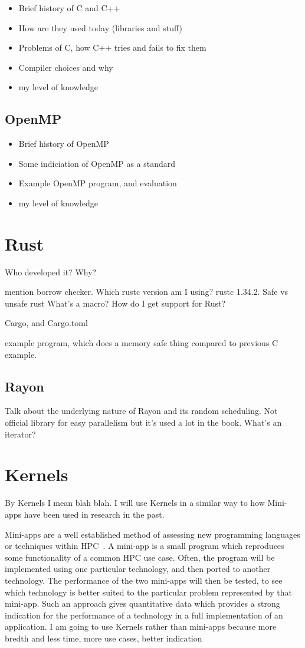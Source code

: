 \begin{itemize}
    \item Brief history of C and C++
    \item How are they used today (libraries and stuff)
    \item Problems of C, how C++ tries and fails to fix them
    \item Compiler choices and why
    \item my level of knowledge
\end{itemize}
\subsection{OpenMP}
\begin{itemize}
    \item Brief history of  OpenMP
    \item Some indiciation of OpenMP as a standard
    \item Example OpenMP program, and evaluation
    \item my level of knowledge
\end{itemize}

\section{Rust}
Who developed it? Why?

mention borrow checker. Which rustc version am I using? rustc 1.34.2. Safe vs unsafe rust
What's a macro?
How do I get support for Rust?

Cargo, and Cargo.toml
 
example program, which does a memory safe thing compared to previous C example.
\subsection{Rayon}
Talk about the underlying nature of Rayon and its random scheduling. Not official library for easy parallelism but it's used a lot in the book.
What's an iterator?
\section{Kernels}
By Kernels I mean blah blah. I will use Kernels in a similar way to how Mini-apps have been used in research in the past.

Mini-apps are a well established method of assessing new programming languages or techniques within HPC~\cite{Mallinson:2014, Slaughter:2015, martineau2017arch}. A mini-app is a small program which reproduces some functionality of a common HPC use case. Often, the program will be implemented using one particular technology, and then ported to another technology. The performance of the two mini-apps will then be tested, to see which technology is better suited to the particular problem represented by that mini-app. Such an approach gives quantitative data which provides a strong indication for the performance of a technology in a full implementation of an application. I am going to use Kernels rather than mini-apps because more bredth and less time, more use cases, better indication

